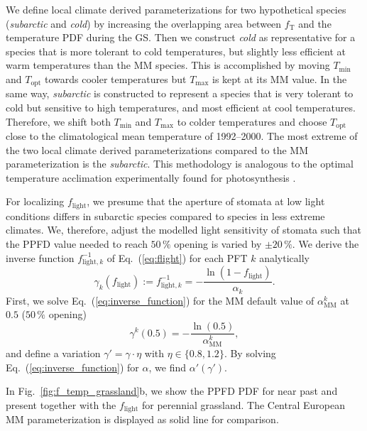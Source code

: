 \documentclass[bg, manuscript]{copernicus}
\begin{document}
We define local climate derived parameterizations for two hypothetical species (\emph{subarctic} and \emph{cold}) by increasing the overlapping area between $f_\mathrm{T}$ and the temperature PDF during the GS. Then we construct \emph{cold} as representative for a species that is more tolerant to cold temperatures, but slightly less efficient at warm temperatures than the MM species. This is accomplished by moving $T_\mathrm{min}$ and $T_\mathrm{opt}$ towards cooler temperatures but $T_\mathrm{max}$ is kept at its MM value. In the same way, \emph{subarctic} is constructed to represent a species that is very tolerant to cold but sensitive to high temperatures, and most efficient at cool temperatures. Therefore, we shift both $T_\mathrm{min}$ and $T_\mathrm{max}$ to colder temperatures and choose $T_\mathrm{opt}$ close to the climatological mean temperature of 1992--2000. The most extreme of the two local climate derived parameterizations compared to the MM parameterization is the \emph{subarctic}. This methodology is analogous to the optimal temperature acclimation experimentally found for photosynthesis \citep{PR:Way2013}.

For localizing $f_\mathrm{light}$, we presume that the aperture of stomata at low light conditions differs in subarctic species compared to species in less extreme climates. We, therefore, adjust the modelled light sensitivity of stomata such that the PPFD value needed to reach $50\,\unit{\%}$ opening is varied by $\pm 20\,\unit{\%}$. We derive the inverse function $f_{\mathrm{light},k}^{-1}$ of Eq.~(\ref{eq:flight}) for each PFT $k$ analytically
%
\begin{equation}
  \gamma_k(f_\mathrm{light}) := f_{\mathrm{light}, k}^{-1} = -\frac{\ln(1-f_\mathrm{light})}{\alpha_k}.
  \label{eq:inverse_function}
\end{equation}
%
First, we solve Eq.~(\ref{eq:inverse_function}) for the MM default value of $\alpha_\mathrm{MM}^k$ at $0.5$ ($50\,\%$ opening)
\begin{equation}
  \gamma^k(0.5) = -\frac{\ln(0.5)}{\alpha_\mathrm{MM}^k},
  \label{eq:inverse_function_halfway}
\end{equation}
and define a variation $\gamma' = \gamma \cdot \eta$ with $\eta \in \{0.8, 1.2\}$. By solving Eq.~(\ref{eq:inverse_function}) for $\alpha$, we find $\alpha'(\gamma')$. 

In Fig.~\ref{fig:f_temp_grassland}b, we show the PPFD PDF for near past and present together with the $f_\mathrm{light}$ for perennial grassland. The Central European MM parameterization is displayed as solid line for comparison. 
\end{document}
